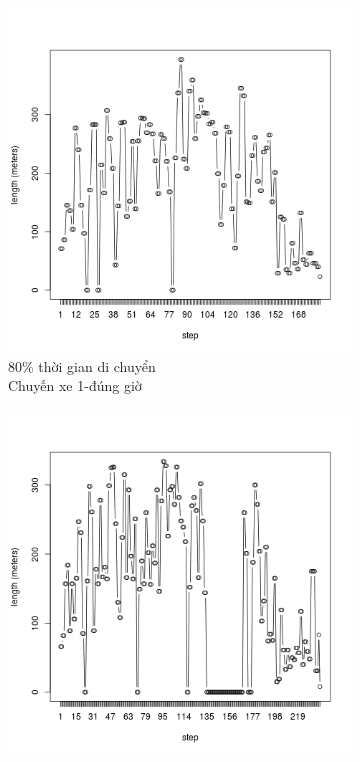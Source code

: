 \documentclass[a4paper, 13pt]{report}
\begin{document}
\begin{figure}
        \begin{subfigure}[b]{0.25\textwidth}
                \includegraphics[width=\linewidth]{test1}
                \caption*{80\% thời gian di chuyển\\Chuyến xe 1-đúng giờ}
        \end{subfigure}%
        \begin{subfigure}[b]{0.25\textwidth}
                \includegraphics[width=\linewidth]{test2}

\end{subfigure}
\end{figure}
\end{document}
